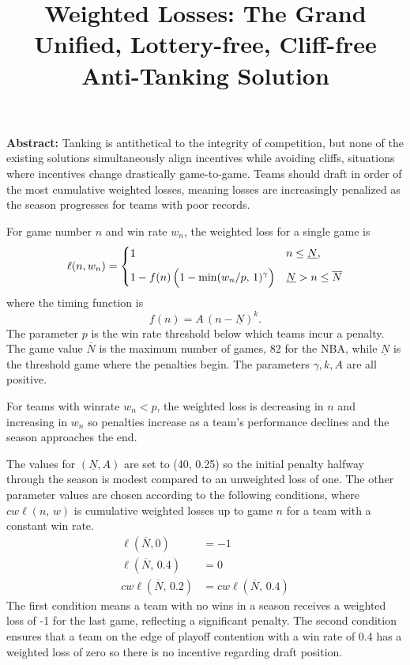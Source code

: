 \documentclass[11pt]{article}
\title{\vspace{-1em}Weighted Losses: The Grand Unified, Lottery-free, Cliff-free Anti-Tanking Solution}
\author{}
\date{}
\begin{document}
\maketitle
\thispagestyle{empty}
\vspace{-2em}

\textbf{Abstract:} Tanking is antithetical to the integrity of competition, but none of the existing solutions simultaneously align incentives while avoiding cliffs, situations where incentives change drastically game-to-game. Teams should draft in order of the most cumulative weighted losses, meaning losses are increasingly penalized as the season progresses for teams with poor records. 

For game number $n$ and win rate $w_{n}$, the weighted loss for a single game is 
\begin{equation}
  \ell(n, w_{n}) =
  \begin{cases}
    1 & n \le \underline{N}, \\[6pt]
    \displaystyle 1 - f(n)\,\Bigl(1 - \min(w_{n}/p,\,1)^{\gamma}\Bigr)
    & \underline{N} > n \le \overline{N}
  \end{cases}
\end{equation}
where the timing function is 
\begin{equation}
  f(n) = A \,(n - \underline{N})^{k}.
\end{equation}
The parameter $p$ is the win rate threshold below which teams incur a penalty. The game value $\overline{N}$ is the maximum number of games, 82 for the NBA, while $\underline{N}$ is the threshold game where the penalties begin. The parameters $\gamma, k, A$ are all positive.

For teams with winrate $w_{n}<p$, the weighted loss is decreasing in $n$ and increasing in $w_{n}$ so penalties increase as a team's performance declines and the season approaches the end.

The values for $(\underline{N}, A)$ are set to (40, 0.25) so the initial penalty halfway through the season is modest compared to an unweighted loss of one. The other parameter values are chosen according to the following conditions, where $cw\ell(n,\,w)$ is cumulative weighted losses up to game $n$ for a team with a constant win rate.
\begin{align}
  \ell(\overline{N}, 0) &= -1\label{eq:c2}\\
  \ell(\overline{N},\,0.4) &= 0 \label{eq:c3}\\
  cw\ell(\overline{N},\,0.2) &= cw\ell(\overline{N},\,0.4) \label{eq:c4}
\end{align}
The first condition means a team with no wins in a season receives a weighted loss of -1 for the last game, reflecting a significant penalty. The second condition ensures that a team on the edge of playoff contention with a win rate of 0.4 has a weighted loss of zero so there is no incentive regarding draft position.
\end{document}
